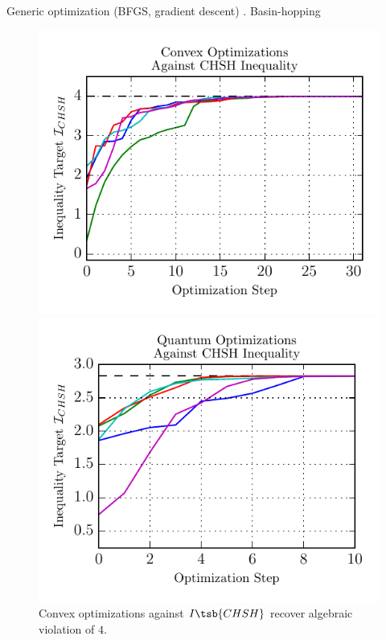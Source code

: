 \documentclass[aps, 10pt, english, twoside, pra, nofootinbib, longbibliography]{revtex4-1}
\begin{document}
    Generic optimization (BFGS, gradient descent) \cite{Nocedal_2000}. Basin-hopping \cite{Wales_1997}

    \begin{figure}
    \newlength\figureheight
    \newlength\figurewidth
    \setlength\figureheight{2.7in}
    \setlength{}
    \begin{center}
        \begin{minipage}[b]{.48\textwidth}
            \centering
            \includegraphics{../../figures/CHSH_convex.pdf}
            \caption{Convex optimizations against $I\tsb{CHSH}$ recover algebraic violation of $4$.}
            \label{fig:CHSH_convex}
        \end{minipage}\hspace{0.04\textwidth}%
        \begin{minipage}[b]{.48\textwidth}
            \centering
            \includegraphics{../../figures/CHSH_quantum.pdf}

\end{minipage}
\end{center}
\end{figure}
\end{document}
